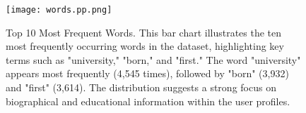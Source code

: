 \begin{figure}[ht]
  \centering
  \texttt{[image: words.pp.png]}
  \caption{Top 10 Most Frequent Words. This bar chart illustrates the ten most frequently occurring words in the dataset, highlighting key terms such as "university," "born," and "first." The word "university" appears most frequently (4,545 times), followed by "born" (3,932) and "first" (3,614). The distribution suggests a strong focus on biographical and educational information within the user profiles.}
  \label{fig:bar_org}
\end{figure}